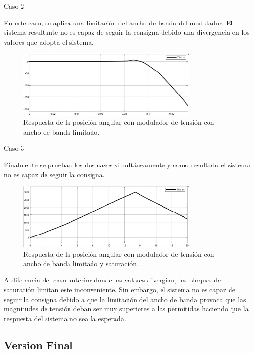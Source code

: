 \documentclass{article}
\begin{document}
\bullet Caso 2

En este caso, se aplica una limitación del ancho de banda del modulador. El sistema resultante no es
capaz de seguir la consigna debido una divergencia en los valores que adopta el sistema.

\begin{figure}[H]
    \centering
    \includegraphics[width=0.8\textwidth]{5.2.5.e.2.png}
    \caption{Respuesta de la posición angular con modulador de tensión con ancho de banda limitado.}
\end{figure}

\bullet Caso 3

Finalmente se prueban los dos casos simultáneamente y como resultado el sistema no es capaz de seguir la consigna. 

\begin{figure}[H]
    \centering
    \includegraphics[width=0.8\textwidth]{5.2.5.e.3.png}
    \caption{Respuesta de la posición angular con modulador de tensión con ancho de banda limitado y saturación.}
\end{figure}

A diferencia del caso anterior donde los valores divergían, los bloques de saturación limitan este inconveniente.
Sin embargo, el sistema no es capaz de seguir la consigna debido a que la limitación del ancho de banda
provoca que las magnitudes de tensión deban ser muy superiores a las permitidas haciendo que la respuesta del sistema
no sea la esperada. 


\subsection{Version Final}
\end{document}
